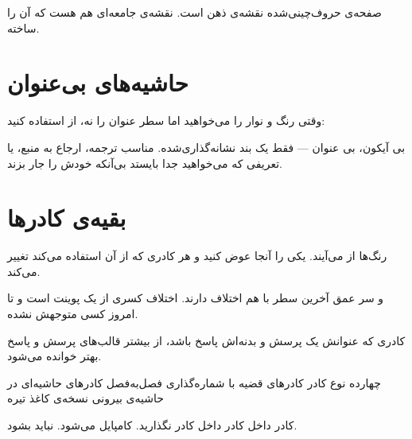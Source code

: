 \begin{quotebox}[برینگهرست]
صفحه‌ی حروف‌چینی‌شده نقشه‌ی ذهن است. نقشه‌ی جامعه‌ای هم هست که آن را ساخته.
\end{quotebox}

\section{حاشیه‌های بی‌عنوان}

وقتی رنگ و نوار را می‌خواهید اما سطر عنوان را نه، از 
استفاده کنید:

\begin{aside}[teal]
بی آیکون، بی عنوان — فقط یک بند نشانه‌گذاری‌شده. مناسب ترجمه، ارجاع به منبع،
یا تعریفی که می‌خواهید جدا بایستد بی‌آنکه خودش را جار بزند.
\end{aside}

\section{بقیه‌ی کادرها}

\begin{abstract}
این فصل کادرها را نشان می‌دهد. همین و بس.
\end{abstract}

\begin{info}
رنگ‌ها از  می‌آیند. یکی را آنجا عوض کنید و هر
کادری که از آن استفاده می‌کند تغییر می‌کند.
\end{info}

\begin{bug}
 و  سر عمق آخرین سطر با هم
اختلاف دارند. اختلاف کسری از یک پوینت است و تا امروز کسی متوجهش نشده.
\end{bug}

\begin{idea}
کادری که عنوانش یک پرسش و بدنه‌اش پاسخ باشد، از بیشتر قالب‌های پرسش و پاسخ
بهتر خوانده می‌شود.
\end{idea}

\begin{todo}
\begin{tasks}
  \task[done] چهارده نوع کادر
  \task[done] کادرهای قضیه با شماره‌گذاری فصل‌به‌فصل
  \task کادرهای حاشیه‌ای در حاشیه‌ی بیرونی
  \task نسخه‌ی کاغذ تیره
\end{tasks}
\end{todo}

\begin{failure}
کادر داخل کادر داخل کادر نگذارید. کامپایل می‌شود. نباید بشود.
\end{failure}

